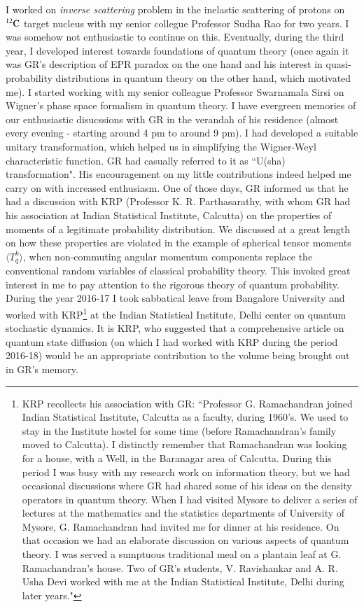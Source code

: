 I worked on \textit{inverse scattering} problem in the inelastic scattering of protons on $^{12}{\rm C}$ target nucleus with my senior collegue Professor Sudha Rao for two years. I was somehow not enthusiastic to continue on this. Eventually, during the third year, I developed interest towards foundations of quantum theory (once again it was GR's description of EPR paradox on the one hand and his interest in quasi-probability distributions in quantum theory on the other hand, which motivated me). I started working with my senior colleague Professor Swarnamala Sirsi on Wigner’s phase space formalism in quantum theory. I have evergreen memories of our enthusiastic disucssions with GR in the verandah of his residence (almost every evening - starting around 4 pm to around 9 pm). I had developed a suitable unitary transformation, which helped us in simplifying the Wigner-Weyl characteristic function. GR had casually referred to it as ``U(sha) transformation". His encouragement on my little contributions indeed helped me carry on with increased enthusiasm. One of those days, GR informed us that he had a discussion with KRP (Professor K. R. Parthasarathy, with whom GR had his association at Indian Statistical Institute, Calcutta) on the properties of moments of a legitimate probability distribution. We discussed at a great length on how these properties are violated in the example of spherical tensor moments $\langle T_{q}^{k} \rangle$, when non-commuting angular momentum components replace the conventional random variables of classical probability theory. This invoked great interest in me to pay attention to the rigorous theory of quantum probability. During the year 2016-17 I took sabbatical leave from Bangalore University and worked with KRP\footnote{KRP recollects his association with GR: ``Professor G. Ramachandran joined Indian Statistical Institute, Calcutta as a faculty, during 1960's. We used to stay in the Institute hostel for some time (before Ramachandran's family moved to Calcutta). I distinctly remember that Ramachandran was looking for a house, with a Well, in the Baranagar area of Calcutta. During this period I was busy with my research work on information theory, but we had occasional discussions where GR had shared some of his ideas on the density operators in quantum theory. When I had visited Mysore to deliver a series of lectures at the mathematics and the statistics departments of University of Mysore, G. Ramachandran had invited me for dinner at his residence. On that occasion we had an elaborate discussion on various aspects of quantum theory. I was served a sumptuous traditional meal on a plantain leaf at G. Ramachandran's house. Two of GR’s students, V. Ravishankar and A. R. Usha Devi worked with me at the Indian Statistical Institute, Delhi during later years."} at the Indian Statistical Institute, Delhi center on quantum stochastic dynamics. It is KRP, who suggested that a comprehensive article on quantum state diffusion (on which I had worked with KRP during the period 2016-18) would be an appropriate contribution to the volume being brought out in GR’s memory.

